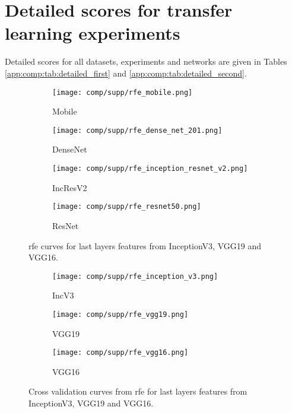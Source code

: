  \section{Detailed scores for transfer learning experiments}
\label{app:comp:sec:detailed_scores}

Detailed scores for all datasets, experiments and networks are given in Tables \ref{app:comp:tab:detailed_first} and \ref{app:comp:tab:detailed_second}.

\begin{figure}
	\centering
  \begin{subfigure}[t]{0.95\textwidth}
    \centering
    \texttt{[image: comp/supp/rfe\_mobile.png]} \\
    \caption{Mobile}
  \end{subfigure}
  \begin{subfigure}[t]{0.95\textwidth}
    \centering
    \texttt{[image: comp/supp/rfe\_dense\_net\_201.png]} \\
    \caption{DenseNet}
  \end{subfigure}
  \begin{subfigure}[t]{0.95\textwidth}
    \centering
    \texttt{[image: comp/supp/rfe\_inception\_resnet\_v2.png]} \\
    \caption{IncResV2}
  \end{subfigure}
    \begin{subfigure}[t]{0.95\textwidth}
    \centering
    \texttt{[image: comp/supp/rfe\_resnet50.png]}
    \caption{ResNet}
  \end{subfigure}
  \caption{\acrshort{rfe} curves for last layers features from InceptionV3, VGG19 and VGG16.}
  \label{app:comp:fig:rfe_1}
\end{figure}

\begin{figure}
	\centering
  \begin{subfigure}[t]{0.99\textwidth}
    \centering
    \texttt{[image: comp/supp/rfe\_inception\_v3.png]} \\
    \caption{IncV3}
  \end{subfigure}
  \begin{subfigure}[t]{0.99\textwidth}
    \centering
    \texttt{[image: comp/supp/rfe\_vgg19.png]} \\
    \caption{VGG19}
  \end{subfigure}
  \begin{subfigure}[t]{0.99\textwidth}
    \centering
    \texttt{[image: comp/supp/rfe\_vgg16.png]} \\
    \caption{VGG16}
  \end{subfigure}
  \caption{Cross validation curves from \acrlong{rfe} for last layers features from InceptionV3, VGG19 and VGG16.}
  \label{app:comp:fig:rfe_2}
\end{figure}

